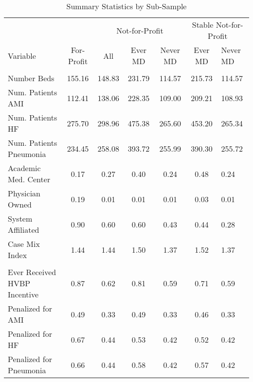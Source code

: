 \begin{table}[h]
\centering
\caption{\label{tab:sumstats_samples} Summary Statistics by Sub-Sample}
\centering
\begin{tabular}[t]{lcccccl}
\toprule
\multicolumn{2}{c}{ } & \multicolumn{3}{c}{Not-for-Profit} & \multicolumn{2}{c}{Stable Not-for-Profit} \\
\cmidrule(l{3pt}r{3pt}){3-5} \cmidrule(l{3pt}r{3pt}){6-7}
Variable & For-Profit & All & Ever MD & Never MD & Ever MD & Never MD\\
\midrule
\addlinespace[0.3em]
\multicolumn{7}{l}{\textbf{Hospital Characteristics}}\\
\hspace{1em}Number Beds & 155.16 & 148.83 & 231.79 & 114.57 & 215.73 & 114.57\\
\hspace{1em}Num. Patients AMI & 112.41 & 138.06 & 228.35 & 109.00 & 209.21 & 108.93\\
\hspace{1em}Num. Patients HF & 275.70 & 298.96 & 475.38 & 265.60 & 453.20 & 265.34\\
\hspace{1em}Num. Patients Pneumonia & 234.45 & 258.08 & 393.72 & 255.99 & 390.30 & 255.72\\
\hspace{1em}Academic Med. Center & 0.17 & 0.27 & 0.40 & 0.24 & 0.48 & 0.24\\
\hspace{1em}Physician Owned & 0.19 & 0.01 & 0.01 & 0.01 & 0.03 & 0.01\\
\hspace{1em}System Affiliated & 0.90 & 0.60 & 0.60 & 0.43 & 0.44 & 0.28\\
\hspace{1em}Case Mix Index & 1.44 & 1.44 & 1.50 & 1.37 & 1.52 & 1.37\\
\addlinespace[0.3em]
\multicolumn{7}{l}{\textbf{Penalty/Payment Variables}}\\
\hspace{1em}Ever Received HVBP Incentive & 0.87 & 0.62 & 0.81 & 0.59 & 0.71 & 0.59\\
\hspace{1em}Penalized for AMI & 0.49 & 0.33 & 0.49 & 0.33 & 0.46 & 0.33\\
\hspace{1em}Penalized for HF & 0.67 & 0.44 & 0.53 & 0.42 & 0.52 & 0.42\\
\hspace{1em}Penalized for Pneumonia & 0.66 & 0.44 & 0.58 & 0.42 & 0.57 & 0.42\\

\end{tabular}
\end{table}
